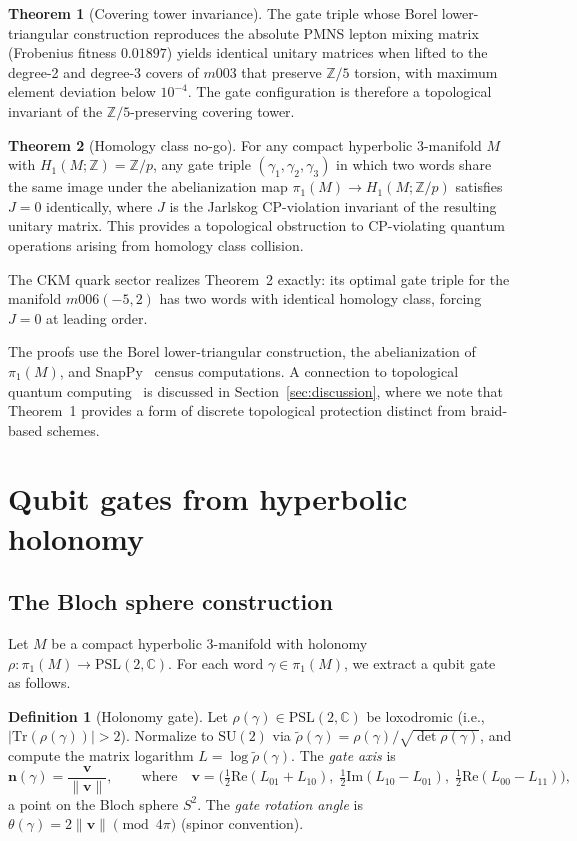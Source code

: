 \documentclass[12pt]{article}
\theoremstyle{definition}
\newtheorem{definition}[theorem]{Definition}
\begin{document}
\textbf{Theorem 1} (Covering tower invariance).
The gate triple whose Borel lower-triangular construction
reproduces the absolute PMNS lepton mixing matrix
(Frobenius fitness $0.01897$) yields identical unitary matrices
when lifted to the degree-2 and degree-3 covers of $m003$
that preserve $\mathbb{Z}/5$ torsion,
with maximum element deviation below $10^{-4}$.
The gate configuration is therefore a topological invariant of
the $\mathbb{Z}/5$-preserving covering tower.

\textbf{Theorem 2} (Homology class no-go).
For any compact hyperbolic 3-manifold $M$ with
$H_1(M;\mathbb{Z}) = \mathbb{Z}/p$, any gate triple
$(\gamma_1, \gamma_2, \gamma_3)$ in which two words share the
same image under the abelianization map
$\pi_1(M) \to H_1(M;\mathbb{Z}/p)$
satisfies $J = 0$ identically, where $J$ is the
Jarlskog CP-violation invariant of the resulting unitary matrix.
This provides a topological obstruction to CP-violating
quantum operations arising from homology class collision.

The CKM quark sector realizes Theorem~2 exactly: its optimal gate
triple for the manifold $m006(-5,2)$ has two words with identical
homology class, forcing $J = 0$ at leading order.

The proofs use the Borel lower-triangular construction,
the abelianization of $\pi_1(M)$, and SnapPy~\cite{SnapPy}
census computations.
A connection to topological quantum computing~\cite{Kitaev2003,
Nayak2008} is discussed in Section~\ref{sec:discussion},
where we note that Theorem~1 provides a form of discrete
topological protection distinct from braid-based schemes.

\section{Qubit gates from hyperbolic holonomy}
\label{sec:gates}

\subsection{The Bloch sphere construction}

Let $M$ be a compact hyperbolic 3-manifold with holonomy
$\rho: \pi_1(M) \to \mathrm{PSL}(2,\mathbb{C})$.
For each word $\gamma \in \pi_1(M)$, we extract a qubit gate
as follows.

\begin{definition}[Holonomy gate]
\label{def:gate}
Let $\rho(\gamma) \in \mathrm{PSL}(2,\mathbb{C})$ be loxodromic
(i.e., $|\mathrm{Tr}(\rho(\gamma))| > 2$). Normalize to
$\mathrm{SU}(2)$ via $\tilde{\rho}(\gamma) = \rho(\gamma) /
\sqrt{\det\rho(\gamma)}$, and compute the matrix logarithm
$L = \log\tilde{\rho}(\gamma)$. The \emph{gate axis} is
\[
  \mathbf{n}(\gamma) = \frac{\mathbf{v}}{\|\mathbf{v}\|},
  \qquad \text{where} \quad
  \mathbf{v} = \bigl(
    \tfrac{1}{2}\mathrm{Re}(L_{01}+L_{10}),\;
    \tfrac{1}{2}\mathrm{Im}(L_{10}-L_{01}),\;
    \tfrac{1}{2}\mathrm{Re}(L_{00}-L_{11})
  \bigr),
\]
a point on the Bloch sphere $S^2$.
The \emph{gate rotation angle} is $\theta(\gamma) = 2\|\mathbf{v}\|
\pmod{4\pi}$ (spinor convention).
\end{definition}
\end{document}
